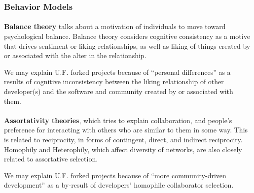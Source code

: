 \documentclass[11pt]{report}
\begin{document}
\subsubsection{Behavior Models}
\paragraph{} \textbf{Balance theory} \cite{Heider} talks about a motivation of individuals to move toward psychological balance. Balance theory considers cognitive consistency as a motive that drives sentiment or liking relationships, as well as liking of things created by or associated with the alter in the relationship.

We may explain U.F. forked projects because of ``personal differences'' as a results of cognitive inconsistency between the liking relationship of other developer(s) and the software and community created by or associated with them. 

\paragraph{} \textbf{Assortativity theories}, which tries to explain collaboration, and people's preference for interacting with others who are similar to them in some way. This is related to reciprocity, in forms of contingent, direct, and indirect reciprocity. Homophily and Heterophily, which affect diversity of networks, are also closely related to assortative selection.

We may explain U.F. forked projects because of ``more community-driven development'' as a by-result of developers' homophile collaborator selection.
\end{document}

